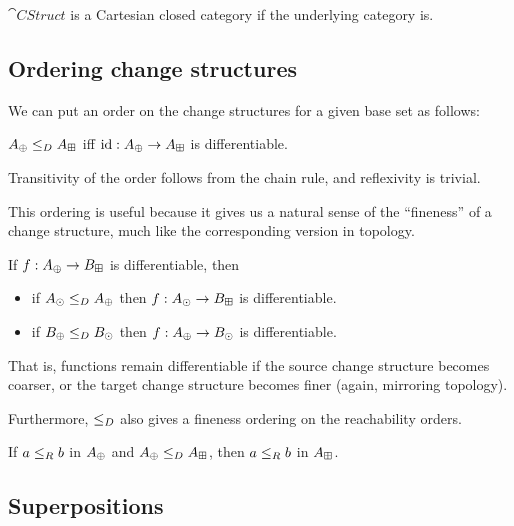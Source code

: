 \begin{thm}
  $\cat{CStruct}$ is a Cartesian closed category if the underlying category is.
\end{thm}

\subsection{Ordering change structures}

We can put an order on the change structures for a given base set as follows:

\begin{defn}
  $A_\oplus \leq_D A_\boxplus$ iff $\textrm{id}: A_\oplus \rightarrow A_\boxplus$ is differentiable.
\end{defn}

Transitivity of the order follows from the chain rule, and reflexivity is trivial.

This ordering is useful because it gives us a natural sense of the ``fineness''
of a change structure, much like the corresponding version in topology.

\begin{prop}
  If $f: A_\oplus \rightarrow B_\boxplus$ is differentiable, then
  \begin{itemize}
    \item if $A_\odot \leq_D A_\oplus$ then $f: A_\odot \rightarrow
      B_\boxplus$ is differentiable.
    \item if $B_\oplus \leq_D B_\odot$ then $f: A_\oplus \rightarrow
      B_\odot$ is differentiable.
  \end{itemize}
\end{prop}

That is, functions remain differentiable if the source change structure becomes
coarser, or the target change structure becomes finer (again, mirroring topology).

Furthermore, $\leq_D$ also gives a fineness ordering on the reachability orders.

\begin{prop}
  If $a \leq_R b$ in $A_\oplus$ and $A_\oplus \leq_D A_\boxplus$, then $a \leq_R b$ in $A_\boxplus$.
\end{prop}

\subsection{Superpositions}

